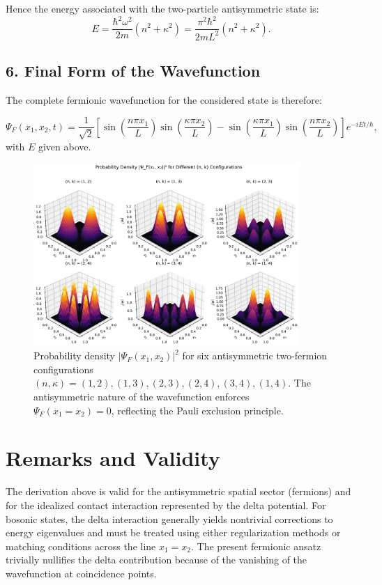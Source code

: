 Hence the energy associated with the two-particle antisymmetric state is:
\begin{equation}
	E = \frac{\hbar^{2}\omega^{2}}{2m}(n^{2} + \kappa^{2}) = \frac{\pi^{2}\hbar^{2}}{2mL^{2}}(n^{2} + \kappa^{2}).
\end{equation}

\subsection*{6. Final Form of the Wavefunction}

The complete fermionic wavefunction for the considered state is therefore:


\begin{equation}
	\Psi_F(x_1, x_2, t) = \frac{1}{\sqrt{2}}
	\left[
		\sin\left(\frac{n\pi x_1}{L}\right)\sin\left(\frac{\kappa\pi x_2}{L}\right)
		- \sin\left(\frac{\kappa\pi x_1}{L}\right)\sin\left(\frac{n\pi x_2}{L}\right)
	\right]
	e^{-iEt/\hbar},
\end{equation}
with $E$ given above.

\begin{figure}[h!]
	\centering
	\includegraphics[width=0.9\textwidth]{ figures/fermions_3D_collage-1.pdf}
	\caption{Probability density $|\Psi_F(x_1, x_2)|^2$ for six antisymmetric two-fermion configurations
		$(n,\kappa) = (1,2), (1,3), (2,3), (2,4), (3,4), (1,4)$.
	The antisymmetric nature of the wavefunction enforces $\Psi_F(x_1 = x_2) = 0$, reflecting the Pauli exclusion principle.}
	\label{fig:fermion_3D_collage}
\end{figure}


\section{Remarks and Validity}

The derivation above is valid for the antisymmetric spatial sector (fermions) and for the idealized contact interaction represented by the delta potential. For bosonic states, the delta interaction generally yields nontrivial corrections to energy eigenvalues and must be treated using either regularization methods or matching conditions across the line $x_1=x_2$. The present fermionic ansatz trivially nullifies the delta contribution because of the vanishing of the wavefunction at coincidence points.
